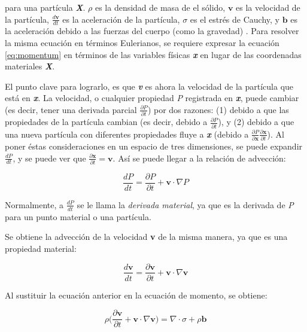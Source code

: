 
para una partícula \textbf{\textit{X}}. $\rho$ es la densidad de masa de el sólido, $\textbf{v}$ es la velocidad de la partícula, $\frac{d\textbf{v}}{dt}$ es la aceleración de la partícula, $\sigma$ es el estrés de Cauchy, y $\textbf{b}$ es la aceleración debido a las fuerzas del cuerpo (como la gravedad) \citep{levin2011eulerian}. Para resolver la misma ecuación en términos Eulerianos, se requiere expresar la ecuación \ref{eq:momentum} en términos de las variables físicas \textbf{\textit{x}} en lugar de las coordenadas materiales \textbf{\textit{X}}.

El punto clave para lograrlo, es que \textbf{\textit{v}} es ahora la velocidad de la partícula que está en \textbf{\textit{x}}. La velocidad, o cualquier propiedad \textit{P} registrada en \textbf{\textit{x}}, puede cambiar (es decir, tener una derivada parcial $\frac{\partial P}{\partial t}$) por dos razones: (1) debido a que las propiedades de la partícula cambian (es decir, debido a $\frac{\partial P}{\partial t}$), y (2) debido a que una nueva partícula con diferentes propiedades fluye a \textbf{\textit{x}} (debido a $\frac{\partial P}{\partial \textbf{x}} \frac{\partial \textbf{x}}{\partial t}$). Al poner éstas consideraciones en un espacio de tres dimensiones, se puede expandir $\frac{d P}{d t}$, y se puede ver que $\frac{\partial \textbf{x}}{\partial t} = \textbf{v}$. Así se puede llegar a la relación de advección:

\begin{equation}
	\frac{d P}{d t} = \frac{\partial P}{\partial t} + \textbf{v} \cdot \nabla P
\end{equation}

Normalmente, a $\frac{d P}{d t}$ se le llama la \textit{derivada material}, ya que es la derivada de \textit{P} para un punto material o una partícula. 

Se obtiene la advección de la velocidad \textbf{v} de la misma manera, ya que es una propiedad material:

\begin{equation}
	\frac{d \textbf{v}}{d t} = \frac{\partial \textbf{v}}{\partial t} + \textbf{v} \cdot \nabla \textbf{v}
\end{equation}

Al sustituir la ecuación anterior en la ecuación de momento, se obtiene:

\begin{equation}
	\rho \bigg( \frac{\partial \textbf{v}}{\partial t} + \textbf{v} \cdot \nabla \textbf{v} \bigg) = \nabla \cdot \sigma + \rho \textbf{b}
\end{equation}

